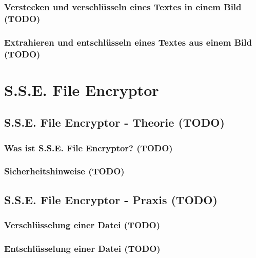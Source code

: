 \documentclass[12pt,a4paper]{scrreprt}
\begin{document}
\section{Verstecken und verschlüsseln eines Textes in einem Bild (TODO)}

\section{Extrahieren und entschlüsseln eines Textes aus einem Bild (TODO)}


\part{S.S.E. File Encryptor}

\chapter{S.S.E. File Encryptor - Theorie (TODO)}

\section{Was ist S.S.E. File Encryptor? (TODO)}

\section{Sicherheitshinweise (TODO)}

\chapter{S.S.E. File Encryptor - Praxis (TODO)}

\section{Verschlüsselung einer Datei (TODO)}

\section{Entschlüsselung einer Datei (TODO)}
\end{document}
